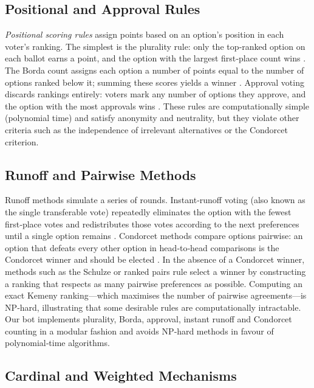 \subsection{Positional and Approval Rules}

\emph{Positional scoring rules} assign points based on an option’s
position in each voter’s ranking.  The simplest is the plurality rule:
only the top‑ranked option on each ballot earns a point, and the option
with the largest first‑place count wins \cite{Black1958}.  The Borda
count assigns each option a number of points equal to the number of
options ranked below it; summing these scores yields a winner \cite{Borda1784}.  Approval voting discards rankings entirely: voters
mark any number of options they approve, and the option with the most
approvals wins \cite{Black1958}.  These rules are computationally
simple (polynomial time) and satisfy anonymity and neutrality, but they
violate other criteria such as the independence of irrelevant alternatives
or the Condorcet criterion.

\subsection{Runoff and Pairwise Methods}

Runoff methods simulate a series of rounds.  Instant‑runoff voting
(also known as the single transferable vote) repeatedly eliminates the
option with the fewest first‑place votes and redistributes those votes
according to the next preferences until a single option remains \cite{Bartholdi1989}.
Condorcet methods compare options pairwise: an option that defeats every
other option in head‑to‑head comparisons is the Condorcet winner and
should be elected \cite{Condorcet1785}.  In the absence of a Condorcet
winner, methods such as the Schulze or ranked pairs rule select a
winner by constructing a ranking that respects as many pairwise
preferences as possible.  Computing an exact Kemeny ranking—which
maximises the number of pairwise agreements—is NP‑hard, illustrating
that some desirable rules are computationally intractable.  Our bot
implements plurality, Borda, approval, instant runoff and Condorcet
counting in a modular fashion and avoids NP‑hard methods in favour of
polynomial‑time algorithms.

\subsection{Cardinal and Weighted Mechanisms}

